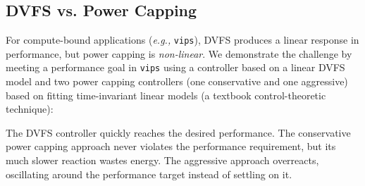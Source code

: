\documentclass[a0,portrait]{a0poster}
\newcommand{\eg}{\textit{e.g., }}
\newcommand{\app}[1]{\mbox{\texttt{#1}}}
\newcommand{\PAD}{\vskip 0.75cm}
\begin{document}
\begin{multicols}{2}



\color{DarkSlateGray} %




\vspace{-1.5cm}
\section*{DVFS vs. Power Capping}

{
\PAD
\centering
  \begin{minipage}{.5\linewidth}
    \centering
    \label{fig:tradeoffs-vips-dvfs}
  \end{minipage}
  \begin{minipage}{.5\linewidth}
    \centering
    \label{fig:tradeoffs-vips-pwr}
  \end{minipage}
}

For compute-bound applications (\eg \app{vips}), DVFS produces a linear response in performance, but power capping is \emph{non-linear}.
We demonstrate the challenge by meeting a performance goal in \app{vips} using a controller based on a linear DVFS model and two power capping controllers (one conservative and one aggressive) based on fitting time-invariant linear models (a textbook control-theoretic technique):
{
\PAD
\centering
  
  \label{fig:vips-example}
\PAD
}
The DVFS controller quickly reaches the desired performance.
The conservative power capping approach never violates the performance requirement, but its much slower reaction wastes energy.
The aggressive approach overreacts, oscillating around the performance target instead of settling on it.



\end{multicols}
\end{document}
